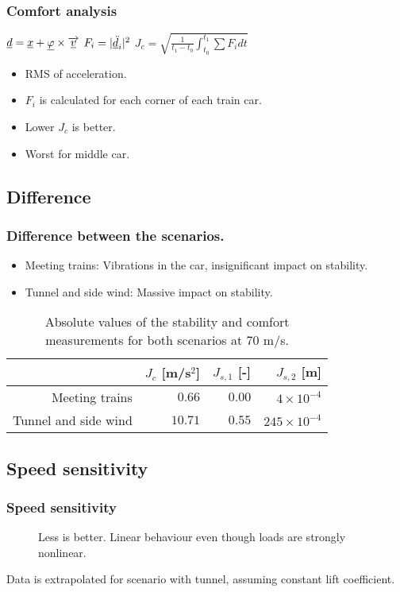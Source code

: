 \documentclass{beamer}
\begin{document}
\begin{frame}
 \frametitle{Comfort analysis}
 \begin{center}
  $\underline{d} = \underline{x} + \underline{\varphi} \times \overrightarrow{\underline{v}} $
  \hspace{10mm}
  $F_i = |\underline{\ddot{d}}_i|^2$
  \hspace{10mm}
  $J_c = \sqrt{\frac{1}{t_1-t_0}\int_{t_0}^{t_1} \sum F_i dt}$
  \end{center}
 \begin{itemize}
  \item RMS of acceleration.
  \item $F_i$ is calculated for each corner of each train car.
  \item Lower $J_c$ is better.
  \item Worst for middle car.
 \end{itemize}
\end{frame}

\subsection{Difference}
\begin{frame}
 \frametitle{Difference between the scenarios.}
 \begin{itemize}
  \item Meeting trains: Vibrations in the car, insignificant impact on stability.
  \item Tunnel and side wind: Massive impact on stability.
 \end{itemize}
 \begin{table}[htpb!]
 \centering
 \caption{Absolute values of the stability and comfort measurements for both scenarios at 70 m/s.}
 \vskip 5mm
 \begin{tabular}{|r|r|r|r|}
  \hline                      & $J_c$ [m/s$^2$] & $J_{s,1}$ [-] &      $J_{s,2}$ [m]\\
  \hline Meeting trains       &          $0.66$ &        $0.00$ &   $4\times10^{-4}$\\
  \hline Tunnel and side wind &         $10.71$ &        $0.55$ & $245\times10^{-4}$\\
  \hline
 \end{tabular}
\end{table}
\end{frame}

\subsection{Speed sensitivity}
\begin{frame}
 \frametitle{Speed sensitivity}
 \begin{figure}
  \centering
  \caption{Less is better. Linear behaviour even though loads are strongly nonlinear.}
 \end{figure}
 Data is extrapolated for scenario with tunnel, assuming constant lift coefficient.
\end{frame}
\end{document}

